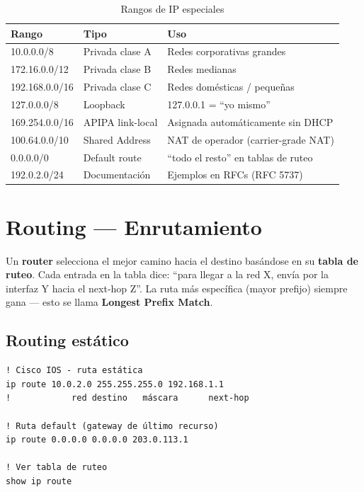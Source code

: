 \begin{table}[h!]
\centering
\renewcommand{\arraystretch}{1.3}
\begin{tabular}{lll}
\toprule
\textbf{Rango} & \textbf{Tipo} & \textbf{Uso} \\
\midrule
10.0.0.0/8           & Privada clase A  & Redes corporativas grandes \\
172.16.0.0/12        & Privada clase B  & Redes medianas \\
192.168.0.0/16       & Privada clase C  & Redes domésticas / pequeñas \\
127.0.0.0/8          & Loopback         & 127.0.0.1 = ``yo mismo'' \\
169.254.0.0/16       & APIPA link-local & Asignada automáticamente sin DHCP \\
100.64.0.0/10        & Shared Address   & NAT de operador (carrier-grade NAT) \\
0.0.0.0/0            & Default route    & ``todo el resto'' en tablas de ruteo \\
192.0.2.0/24         & Documentación    & Ejemplos en RFCs (RFC 5737) \\
\bottomrule
\end{tabular}
\caption{Rangos de IP especiales}
\end{table}

\section{ Routing --- Enrutamiento}

\begin{concepto}
Un \textbf{router} selecciona el mejor camino hacia el destino basándose
en su \textbf{tabla de ruteo}. Cada entrada en la tabla dice:
``para llegar a la red X, envía por la interfaz Y hacia el next-hop Z''.
La ruta más específica (mayor prefijo) siempre gana --- esto se llama
\textbf{Longest Prefix Match}.
\end{concepto}

\subsection{Routing estático}

\begin{codigo}
\begin{lstlisting}
! Cisco IOS - ruta estática
ip route 10.0.2.0 255.255.255.0 192.168.1.1
!            red destino   máscara      next-hop

! Ruta default (gateway de último recurso)
ip route 0.0.0.0 0.0.0.0 203.0.113.1

! Ver tabla de ruteo
show ip route
\end{lstlisting}
\end{codigo}

